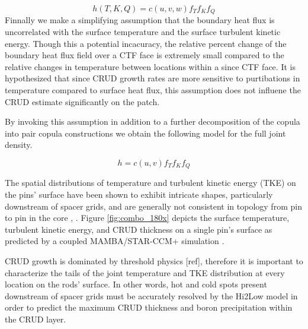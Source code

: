 \documentclass{anstrans}
\begin{document}
\begin{equation}
h(T, K, Q)= c(u, v, w)f_T f_K f_Q
\end{equation}
Finnally we make a simplifying assumption that the boundary heat flux is uncorrelated with the surface temperature and the surface turbulent kinetic energy.  Though this a potential incacuracy, the relative percent change of the boundary heat flux field over a CTF face is extremely small compared to the relative changes in temperature between locations within a since CTF face.  It is hypothesized that since CRUD growth rates are more sensitive to purtibations in temperature compared to surface heat flux, this assumption does not influene the CRUD estimate significantly on the patch.

By invoking this assumption in addition to a further decomposition of the copula into pair copula constructions we obtain the following model for the full joint density.

\begin{equation}
h = c(u,v) f_T f_K f_Q 
\end{equation}


The spatial distributions of temperature and turbulent kinetic energy (TKE) on the pins'
surface have been shown to exhibit intricate shapes, particularly downstream of
spacer grids, and are generally not consistent in topology from pin to pin in the
core \cite{manera16}, \cite{walter16}.  Figure \ref{fig:combo_180x} depicts
the surface temperature, turbulent kinetic energy, and CRUD thickness on a single
pin's surface as predicted by a coupled MAMBA/STAR-CCM+ simulation \cite{slattery16}.



CRUD growth is dominated by threshold physics [ref], therefore it is
important to characterize the tails of the joint temperature and
TKE distribution at every location on the rods' surface.  In other words, hot and cold spots
present downstream of spacer grids must be accurately resolved by the Hi2Low model
in order to predict the maximum CRUD
thickness and boron precipitation within the CRUD layer.  
\end{document}
